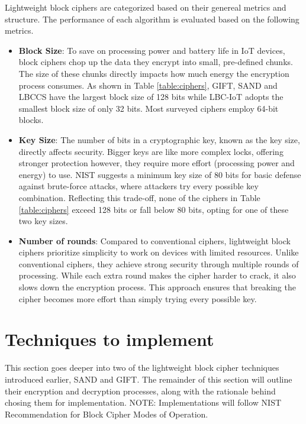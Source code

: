 \documentclass[conference]{IEEEtran}
\begin{document}
Lightweight block ciphers are categorized based on their genereal metrics and structure. The performance of each algorithm is evaluated based on the following metrics.
\begin{itemize}
    \item \textbf{Block Size}: To save on processing power and battery life in IoT devices, block ciphers chop up the data they encrypt into small, pre-defined chunks. The size of these chunks directly impacts how much energy the encryption process consumes. As shown in Table \ref{table:ciphers}, GIFT, SAND and LBCCS have the largest block size of 128 bits while LBC-IoT adopts the smallest block size of only 32 bits. Most surveyed ciphers employ 64-bit blocks.
    \item \textbf{Key Size}: The number of bits in a cryptographic key, known as the key size, directly affects security. Bigger keys are like more complex locks, offering stronger protection however, they require more effort (processing power and energy) to use. NIST suggests a minimum key size of 80 bits for basic defense against brute-force attacks, where attackers try every possible key combination\cite{barker2018transitioning}. Reflecting this trade-off, none of the ciphers in Table \ref{table:ciphers} exceed 128 bits or fall below 80 bits, opting for one of these two key sizes.
    \item \textbf{Number of rounds}: Compared to conventional ciphers, lightweight block ciphers prioritize simplicity to work on devices with limited resources. Unlike conventional ciphers, they achieve strong security through multiple rounds of processing. While each extra round makes the cipher harder to crack, it also slows down the encryption process. This approach ensures that breaking the cipher becomes more effort than simply trying every possible key.
\end{itemize}

\section{Techniques to implement}\label{sec:tec}

This section goes deeper into two of the lightweight block cipher techniques introduced earlier, SAND and GIFT. The remainder of this section will outline their encryption and decryption processes, along with the rationale behind chosing them for implementation. NOTE: Implementations will follow NIST Recommendation for Block Cipher Modes of Operation\cite{dworkin2001recommendation}.
\end{document}
